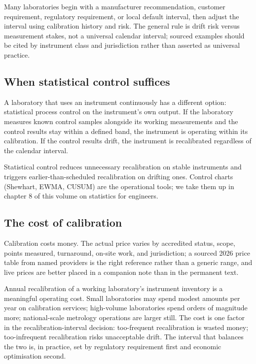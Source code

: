Many laboratories begin with a manufacturer recommendation, customer
requirement, regulatory requirement, or local default interval, then
adjust the interval using calibration history and risk. The general
rule is drift risk versus measurement stakes, not a universal
calendar interval; sourced examples should be cited by instrument
class and jurisdiction rather than asserted as universal practice.

\subsection{When statistical control suffices}

A laboratory that uses an instrument continuously has a different
option: statistical process control on the instrument's own output.
If the laboratory measures known control samples alongside its
working measurements and the control results stay within a defined
band, the instrument is operating within its calibration. If the
control results drift, the instrument is recalibrated regardless of
the calendar interval.

Statistical control reduces unnecessary recalibration on stable
instruments and triggers earlier-than-scheduled recalibration on
drifting ones. Control charts (Shewhart, EWMA, CUSUM) are the
operational tools; we take them up in chapter 8 of this volume on
statistics for engineers.

\subsection{The cost of calibration}

Calibration costs money. The actual price varies by accredited
status, scope, points measured, turnaround, on-site work, and
jurisdiction; a sourced 2026 price table from named providers is the
right reference rather than a generic range, and live prices are
better placed in a companion note than in the permanent text.

Annual recalibration of a working laboratory's instrument inventory
is a meaningful operating cost. Small laboratories may spend
modest amounts per year on calibration services; high-volume
laboratories spend orders of magnitude more; national-scale
metrology operations are larger still. The cost is one factor in
the recalibration-interval decision: too-frequent recalibration is
wasted money; too-infrequent recalibration risks unacceptable drift.
The interval that balances the two is, in practice, set by
regulatory requirement first and economic optimisation second.

